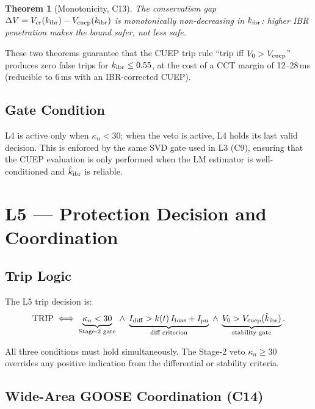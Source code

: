 \documentclass[journal,twoside,10pt]{IEEEtran}
\newcommand{\kappan}{\kappa_{n}}
\newcommand{\kibr}{k_{\rm ibr}}
\newcommand{\hatkibr}{\hat{k}_{\rm ibr}}
\newtheorem{theorem}{Theorem}
\begin{document}
\begin{theorem}[Monotonicity, C13]
The conservatism gap $\Delta V = V_{\rm cr}(\kibr) - V_{\rm cuep}(\kibr)$
is monotonically non-decreasing in $\kibr$: higher IBR penetration
makes the bound safer, not less safe.
\end{theorem}

These two theorems guarantee that the CUEP trip rule
``trip iff $V_0 > V_{\rm cuep}$'' produces zero false trips for
$\kibr \leq 0.55$, at the cost of a CCT margin of 12--28\,ms
(reducible to 6\,ms with an IBR-corrected CUEP).

\subsection{Gate Condition}

L4 is active only when $\kappan < 30$; when the veto is active, L4
holds its last valid decision.  This is enforced by the same SVD
gate used in L3 (C9), ensuring that the CUEP evaluation is only
performed when the LM estimator is well-conditioned and $\hatkibr$
is reliable.

\section{L5 — Protection Decision and Coordination}
\label{sec:L5}

\subsection{Trip Logic}

The L5 trip decision is:
\begin{equation}
\label{eq:trip_logic}
  \text{TRIP} \iff
    \underbrace{\kappan < 30}_{\text{Stage-2 gate}}
    \;\wedge\;
    \underbrace{I_{\rm diff} > k(t)\,I_{\rm bias} + I_{\rm pu}}_{\text{diff criterion}}
    \;\wedge\;
    \underbrace{V_0 > V_{\rm cuep}(\hatkibr)}_{\text{stability gate}}.
\end{equation}

All three conditions must hold simultaneously.  The Stage-2 veto
$\kappan \geq 30$ overrides any positive indication from the
differential or stability criteria.

\subsection{Wide-Area GOOSE Coordination (C14)}
\end{document}
